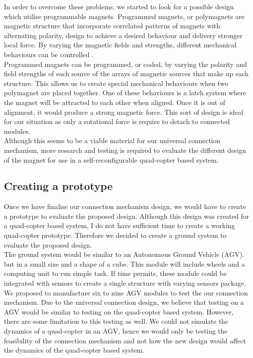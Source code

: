 \documentclass[12pt,A4]{article}
\begin{document}
	In order to overcome these problems, we started to look for a possible design which utilise programmable magnets. Programmed magnets, or polymagnets are magnetic structure that incorporate correlated patterns of magnets with alternating polarity, design to achieve a desired behaviour and delivery stronger local force. By varying the magnetic fields and strengths, different mechanical behaviours can be controlled \citep{polymagnet2008}.\\
	
	Programmed magnets can be programmed, or coded, by varying the polarity and field strengths of each source of the arrays of magnetic sources that make up each structure. This allows us to create special mechanical behaviours when two polymagnet are placed together. One of these behaviours is a latch system where the magnet will be attracted to each other when aligned. Once it is out of alignment, it would produce a strong magnetic force. This sort of design is ideal for our situation as only a rotational force is require to detach to connected modules.\\
	
	Although this seems to be a viable material for our universal connection mechanism, more research and testing is required to evaluate the different design of the magnet for use in a self-reconfigurable quad-copter based system.\\
	
	\subsection{Creating a prototype}
	
	Once we have finalise our connection mechanism design, we would have to create a prototype to evaluate the proposed design. Although this design was created for a quad-copter based system, I do not have sufficient time to create a working quad-copter prototype. Therefore we decided to create a ground system to evaluate the proposed design.\\
	
	The ground system would be similar to an Autonomous Ground Vehicle (AGV). but in a small size and a shape of a cube. This module will include wheels and a computing unit to run simple task. If time permits, these module could be integrated with sensors to create a single structure with varying sensors package.\\
	
	We proposed to manufacture six to nine AGV modules to test the our connection mechanism. Due to the universal connection design, we believe that testing on a AGV would be similar to testing on the quad-copter based system. However, there are some limitation to this testing as well. We could not simulate the dynamics of a quad-copter in an AGV, hence we would only be testing the feasibility of the connection mechanism and not how the new design would affect the dynamics of the quad-copter based system.\\
	
\end{document}
